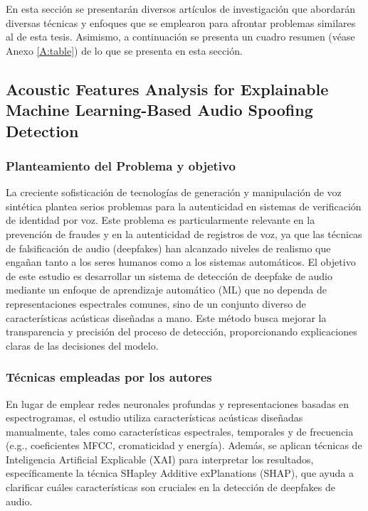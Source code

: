 En esta sección se presentarán diversos artículos de investigación que abordarán diversas técnicas y enfoques que se emplearon para afrontar problemas similares al de esta tesis. Asimismo, a continuación se presenta un cuadro resumen (véase Anexo \ref{A:table}) de lo que se presenta en esta sección.


\subsection{Acoustic Features Analysis for Explainable Machine Learning-Based Audio Spoofing Detection \citep*{pr_dehghani2018copper}}

\subsubsection{Planteamiento del Problema y objetivo }
La creciente sofisticación de tecnologías de generación y manipulación de voz sintética plantea serios problemas para la autenticidad en sistemas de verificación de identidad por voz. Este problema es particularmente relevante en la prevención de fraudes y en la autenticidad de registros de voz, ya que las técnicas de falsificación de audio (deepfakes) han alcanzado niveles de realismo que engañan tanto a los seres humanos como a los sistemas automáticos. El objetivo de este estudio es desarrollar un sistema de detección de deepfake de audio mediante un enfoque de aprendizaje automático (ML) que no dependa de representaciones espectrales comunes, sino de un conjunto diverso de características acústicas diseñadas a mano. Este método busca mejorar la transparencia y precisión del proceso de detección, proporcionando explicaciones claras de las decisiones del modelo.

\subsubsection{Técnicas empleadas por los autores}
En lugar de emplear redes neuronales profundas y representaciones basadas en espectrogramas, el estudio utiliza características acústicas diseñadas manualmente, tales como características espectrales, temporales y de frecuencia (e.g., coeficientes MFCC, cromaticidad y energía). Además, se aplican técnicas de Inteligencia Artificial Explicable (XAI) para interpretar los resultados, específicamente la técnica SHapley Additive exPlanations (SHAP), que ayuda a clarificar cuáles características son cruciales en la detección de deepfakes de audio. 

